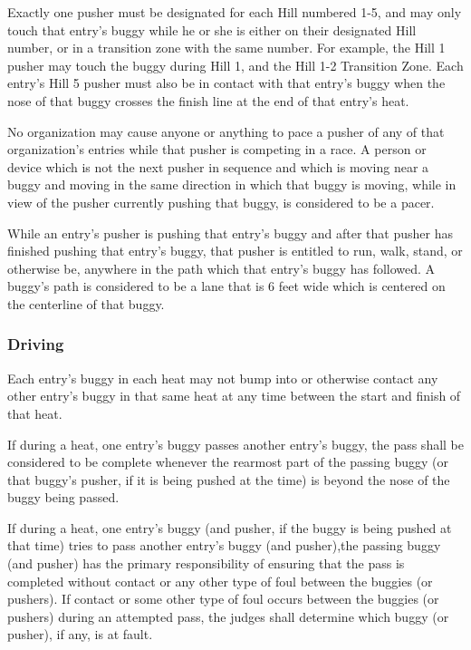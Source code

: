 	Exactly one pusher must be designated for each Hill numbered 1-5, and
	may only touch that entry's buggy while he or she is either on their
	designated Hill number, or in a transition zone with the same number. 
	For example, the Hill 1 pusher may touch the buggy during Hill 1, and the 
	Hill 1-2 Transition Zone. Each entry's Hill 5 pusher must also be in contact 
	with that entry's buggy when the nose of that buggy crosses the finish line at 
	the end of that entry's heat.

	No organization may cause anyone or anything to pace a pusher of any of that
	organization's entries while that pusher is competing in a race. A person or
	device which is not the next pusher in sequence and which is moving near a
	buggy and moving in the same direction in which that buggy is moving, while in
	view of the pusher currently pushing that buggy, is considered to be a pacer.

	While an entry's pusher is pushing that entry's buggy and after that pusher has
	finished pushing that entry's buggy, that pusher is entitled to run, walk,
	stand, or otherwise be, anywhere in the path which that entry's buggy has
	followed. A buggy's path is considered to be a lane that is 6 feet wide which
	is centered on the centerline of that buggy.

\subsubsection{Driving}

	Each entry's buggy in each heat may not bump into or otherwise contact any
	other entry's buggy in that same heat at any time between the start and finish
	of that heat.

	If during a heat, one entry's buggy passes another entry's buggy, the pass
	shall be considered to be complete whenever the rearmost part of the passing
	buggy (or that buggy's pusher, if it is being pushed at the time) is beyond the
	nose of the buggy being passed.

	If during a heat, one entry's buggy (and pusher, if the buggy is being pushed
	at that time) tries to pass another entry's buggy (and pusher),the passing
	buggy (and pusher) has the primary responsibility of ensuring that the pass is
	completed without contact or any other type of foul between the buggies (or
	pushers). If contact or some other type of foul occurs between the buggies (or
	pushers) during an attempted pass, the judges shall determine which buggy (or
	pusher), if any, is at fault.

